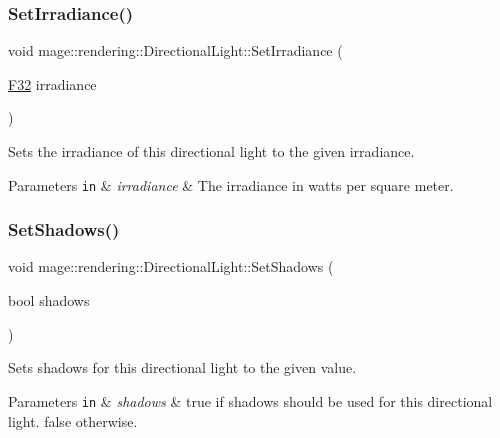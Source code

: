 \subsubsection{\texorpdfstring{Set\+Irradiance()}{SetIrradiance()}}
{\footnotesize\ttfamily void mage\+::rendering\+::\+Directional\+Light\+::\+Set\+Irradiance (\begin{DoxyParamCaption}\item[{\hyperlink{namespacemage_aa97e833b45f06d60a0a9c4fc22ae02c0}{F32}}]{irradiance }\end{DoxyParamCaption})\hspace{0.3cm}{\ttfamily [noexcept]}}

Sets the irradiance of this directional light to the given irradiance.


\begin{DoxyParams}[1]{Parameters}
\mbox{\tt in}  & {\em irradiance} & The irradiance in watts per square meter. \\
\hline
\end{DoxyParams}
\hypertarget{classmage_1_1rendering_1_1_directional_light_a4a8aa135c9366993f6343b33cd4ed9e0}{}\label{classmage_1_1rendering_1_1_directional_light_a4a8aa135c9366993f6343b33cd4ed9e0} 
\subsubsection{\texorpdfstring{Set\+Shadows()}{SetShadows()}}
{\footnotesize\ttfamily void mage\+::rendering\+::\+Directional\+Light\+::\+Set\+Shadows (\begin{DoxyParamCaption}\item[{bool}]{shadows }\end{DoxyParamCaption})\hspace{0.3cm}{\ttfamily [noexcept]}}

Sets shadows for this directional light to the given value.


\begin{DoxyParams}[1]{Parameters}
\mbox{\tt in}  & {\em shadows} & {\ttfamily true} if shadows should be used for this directional light. {\ttfamily false} otherwise. \\
\hline
\end{DoxyParams}
\hypertarget{classmage_1_1rendering_1_1_directional_light_a34a939e192e857ac25f6d91dd773ec9b}{}\label{classmage_1_1rendering_1_1_directional_light_a34a939e192e857ac25f6d91dd773ec9b} 
